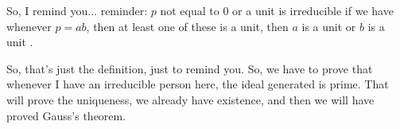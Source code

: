 \begin{speech}[00:13:05 - 00:13:52]
So, I remind you... reminder: $p$ not equal to $0$ or a unit is irreducible if we have whenever $p = ab$, then at least one of these is a unit, then $a$ is a unit or $b$ is a unit .

So, that's just the definition, just to remind you. So, we have to prove that whenever I have an irreducible person here, the ideal generated is prime. That will prove the uniqueness, we already have existence, and then we will have proved Gauss's theorem.
\end{speech}


\begin{content}
\end{content}

\begin{hidden}
\end{hidden}

